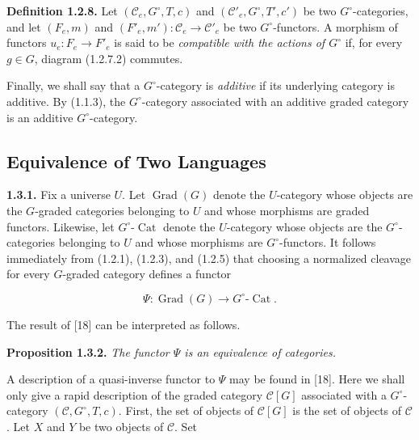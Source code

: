 %
\noindent\textbf{Definition 1.2.8.}\quad
Let $(\mathcal C_e,G^\circ,T,c)$ and
$(\mathcal C'_e,G^\circ,T',c')$ be two $G^\circ$-categories, and let
$(F_e,m)$ and $(F'_e,m')\colon\mathcal C_e\to\mathcal C'_e$ be two
$G^\circ$-functors. A morphism of functors
$u_e\colon F_e\to F'_e$ is said to be \emph{compatible with the actions
of $G^\circ$} if, for every $g\in G$, diagram (1.2.7.2) commutes.

Finally, we shall say that a $G^\circ$-category is \emph{additive} if
its underlying category is additive. By (1.1.3), the
$G^\circ$-category associated with an additive graded category is an
additive $G^\circ$-category.

\subsection{Equivalence of Two Languages}

\noindent\textbf{1.3.1.}\quad
Fix a universe $U$. Let $\operatorname{Grad}(G)$ denote the
$U$-category whose objects are the $G$-graded categories belonging to
$U$ and whose morphisms are graded functors. Likewise, let
$G^\circ\text{-}\operatorname{Cat}$ denote the $U$-category whose
objects are the $G^\circ$-categories belonging to $U$ and whose
morphisms are $G^\circ$-functors. It follows immediately from (1.2.1),
(1.2.3), and (1.2.5) that choosing a normalized cleavage for every
$G$-graded category defines a functor

\begin{equation}
  \Psi\colon \operatorname{Grad}(G)
  \longrightarrow G^\circ\text{-}\operatorname{Cat}.
  \tag{1.3.1.1}
\end{equation}

The result of [18] can be interpreted as follows.

\noindent\textbf{Proposition 1.3.2.}\quad
\emph{The functor $\Psi$ is an equivalence of categories.}

A description of a quasi-inverse functor to $\Psi$ may be found in
[18]. Here we shall only give a rapid description of the graded
category $\mathcal C[G]$ associated with a $G^\circ$-category
$(\mathcal C,G^\circ,T,c)$. First, the set of objects of
$\mathcal C[G]$ is the set of objects of $\mathcal C$. Let $X$ and $Y$
be two objects of $\mathcal C$. Set


